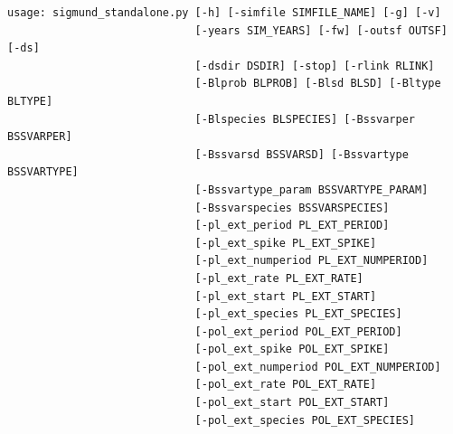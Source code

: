 \fontsize{3mm}{3mm}\selectfont
\begin{verbatim}
usage: sigmund_standalone.py [-h] [-simfile SIMFILE_NAME] [-g] [-v]
                             [-years SIM_YEARS] [-fw] [-outsf OUTSF] [-ds]
                             [-dsdir DSDIR] [-stop] [-rlink RLINK]
                             [-Blprob BLPROB] [-Blsd BLSD] [-Bltype BLTYPE]
                             [-Blspecies BLSPECIES] [-Bssvarper BSSVARPER]
                             [-Bssvarsd BSSVARSD] [-Bssvartype BSSVARTYPE]
                             [-Bssvartype_param BSSVARTYPE_PARAM]
                             [-Bssvarspecies BSSVARSPECIES]
                             [-pl_ext_period PL_EXT_PERIOD]
                             [-pl_ext_spike PL_EXT_SPIKE]
                             [-pl_ext_numperiod PL_EXT_NUMPERIOD]
                             [-pl_ext_rate PL_EXT_RATE]
                             [-pl_ext_start PL_EXT_START]
                             [-pl_ext_species PL_EXT_SPECIES]
                             [-pol_ext_period POL_EXT_PERIOD]
                             [-pol_ext_spike POL_EXT_SPIKE]
                             [-pol_ext_numperiod POL_EXT_NUMPERIOD]
                             [-pol_ext_rate POL_EXT_RATE]
                             [-pol_ext_start POL_EXT_START]
                             [-pol_ext_species POL_EXT_SPECIES]


\end{verbatim}
